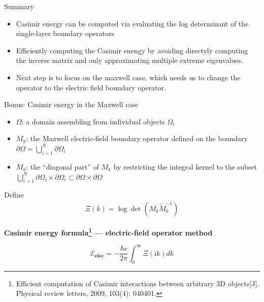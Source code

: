 \documentclass[dvipsnames,10pt]{beamer}
\begin{document}
\begin{frame}{Summary}
\begin{itemize}
    \item Casimir energy can be computed via evaluating the log determinant of the single-layer boundary operators
    \vspace{0.4cm}
    \item Efficiently computing the Casimir enengy by avoiding directyly computing the inverse matrix and only approximating multiple extreme eigenvalues.
        \vspace{0.4cm}

    \item Next step is to focus on the maxwell case, which needs us to change the operator to the electric field boundary operator. 
        \vspace{0.4cm}

\end{itemize}
\end{frame}
\begin{frame}{Bonus: Casimir energy in the Maxwell case}
\begin{itemize}
        \item $\Omega$: a domain assembling from individual objects $\Omega_{i}$
        \item $M_{k}$: the Maxwell electric-field boundary operator defined on the boundary 
        $\partial\Omega = \bigcup_{i = 1}^{N}\partial\Omega_{i}$
        \item $\tilde{M}_{k}$: the ``diagonal part'' of $M_{k}$ by restricting the integral 
        kernel to the subset $\bigcup_{i = 1}^{N}\partial\Omega_{i}\times\partial\Omega_{i}\subset\partial\Omega\times\partial\Omega$ 
    \end{itemize}
Define
\begin{align*}
    \Xi(k) = \log\det\left(M_{k}\tilde{M}_{k}^{-1}\right)
\end{align*}

\begin{tcolorbox}
    \textbf{Casimir energy formula\footnote{ Efficient computation of Casimir interactions between arbitrary 3D objects[J]. Physical review letters, 2009, 103(4): 040401.} ---
    electric-field  operator method}
    
    $$\mathcal{E}_{\textbf{elec}} =  -\frac{\hbar c}{2\pi}\int_{0}^{\infty}\Xi(\mathrm{i}k)dk$$
\end{tcolorbox}
\end{frame}
\end{document}
